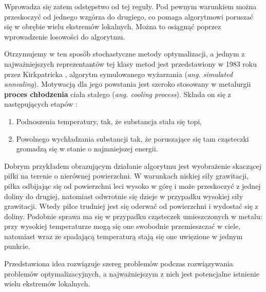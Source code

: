 \documentclass{pracamgr}
\begin{document}
Wprowadza się zatem odstępstwo od tej reguły. Pod pewnym warunkiem można przeskoczyć od 
jednego wzgórza do drugiego, co pomaga algorytmowi poruszać się w obrębie wielu ekstremów lokalnych.
Można to osiągnąć poprzez wprowadzenie losowości do algorytmu. 

Otrzymujemy w ten sposób stochastyczne metody optymalizacji, a jednym z najważniejszych 
reprezentantów tej klasy metod jest przedstawiony w 1983 roku przez Kirkpatricka 
\cite{Kirkpatrick},  algorytm symulowanego wyżarzania  (\textit{ang. simulated annealing}). 
Motywacją dla jego powstania jest szeroko stosowany w metalurgii \textbf{proces chłodzenia}
 ciała stałego (\textit{ang. cooling process}). Składa on się z
następujących etapów  \cite{ChenBin}:

\begin{enumerate}
  \item Podnoszenia temperatury, tak, że substancja stała się topi,
  \item Powolnego wychładzania substancji tak, że poruszające się tam cząsteczki gromadzą się w stanie o najmniejszej energii.
\end{enumerate}

Dobrym przykładem obrazującym działanie algorytmu jest wyobrażenie skaczącej piłki na terenie 
o nierównej powierzchni.
W warunkach niskiej siły grawitacji, piłka odbijając się od powierzchni leci wysoko w górę i może
przeskoczyć z jednej doliny do drugiej, natomiast odwrotnie się dzieje w przypadku wysokiej siły
grawitacji. Wtedy piłce trudniej jest się oderwać od powierzchni i wydostać się z doliny. Podobnie
sprawa ma się w przypadku cząsteczek umieszczonych w metalu: przy wysokiej 
temperaturze mogą się one swobodnie przemieszczać w ciele, natomiast wraz ze spadającą temperaturą 
stają się one uwięzione w jednym punkcie.

Przedstawiona idea rozwiązuje szereg problemów podczas rozwiązywania problemów optymalizacyjnych, a 
najważniejszym z nich jest potencjalne istnienie wielu ekstremów lokalnych.
\end{document}
